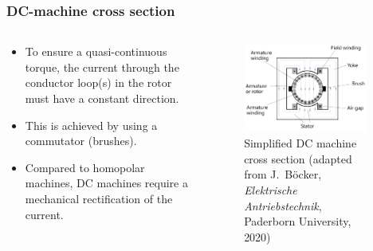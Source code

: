 \begin{frame}
	\frametitle{DC-machine cross section}
    \begin{columns}
		\begin{column}{0.42\textwidth}
            \begin{itemize}
				\item To ensure a quasi-continuous torque, the current through the conductor loop(s) in the rotor must have a constant direction.
				\item<2-> This is achieved by using a commutator (brushes).
				\item<3-> Compared to homopolar machines, DC machines require a mechanical rectification of the current.
			\end{itemize}
		\end{column}
        \hfill
		\begin{column}{0.55\textwidth}
			\begin{figure}
				\centering
				\includegraphics[width=0.925\textwidth]{fig/lec03/DC_machine_cross_section.pdf}
				\caption{Simplified DC machine cross section (adapted from J.~B\"ocker, \textit{Elektrische Antriebstechnik}, Paderborn University, 2020)}
				\label{fig:DC_machine_cross_section}
			\end{figure}
		\end{column}
		\end{columns}
\end{frame}

